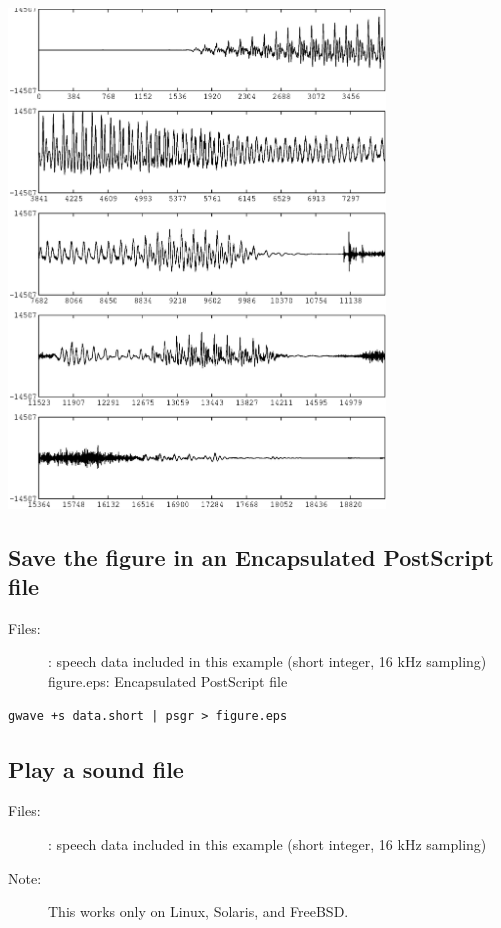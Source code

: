 \documentclass[a4paper,10pt]{article}
\begin{document}
\includegraphics[width=10cm]{eps/data.gwave.eps}

\subsection{Save the figure in an Encapsulated PostScript file}

\begin{description}
\item[Files:]
  : speech data included in this example (short integer, 16 kHz sampling)\\
  figure.eps: Encapsulated PostScript file
\end{description}

\begin{verbatim}
gwave +s data.short | psgr > figure.eps
\end{verbatim}

\subsection{Play a sound file}

\begin{description}
\item[Files:]
  : speech data included in this example (short integer, 16 kHz sampling)
\item[Note:]
  This works only on Linux, Solaris, and FreeBSD.
\end{description}
\end{document}
